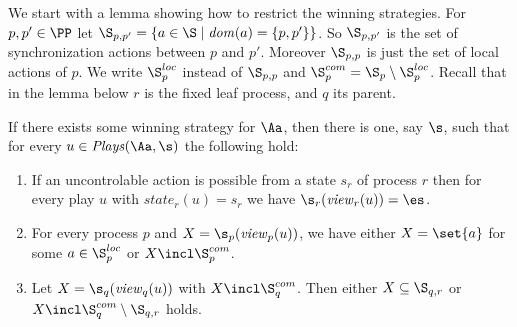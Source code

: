 \documentclass{llncs}
\newcommand{\state}{\mathit{state}}
\newcommand{\loc}{\mathit{dom}}
\newcommand{\Plays}{\mathit{Plays}}
\newcommand{\view}{\mathit{view}}
\begin{document}
We start with a lemma showing how to
restrict the winning strategies. 
For $p,p' \in \PP$ let $\S_{p,p'} =\{a
\in\S \mid \loc(a)=\{p,p'\}\}$. So $\S_{p,p'}$ is the set of
synchronization actions between $p$ and $p'$. Moreover $\S_{p,p}$ is
just the set of local actions of $p$. We write $\S^{loc}_p$ instead of
$\S_{p,p}$ and $\S^{com}_p = \S_p \setminus \S^{loc}_p$. Recall that in
the lemma below $r$ is the fixed leaf process, and $q$ its
parent. 


 \begin{lemma}\label{l:separation}
  If there exists some winning strategy for $\Aa$, then there is one, say
  $\s$,  such that for every  $u \in \Plays(\Aa,\s)$ the
  following hold:
  \begin{enumerate}
  \item If an uncontrolable action is possible from a state $s_r$ of
    process $r$ then for every play $u$ with $\state_r(u)=s_r$ we have
    $\s_r(\view_r(u))=\es$.
  \item For every process $p$ and $X=\s_p(\view_p(u))$, we have either
    $X=\set{a}$ for some $a\in\S^{loc}_p$ or $X\incl\S_p^{com}$.
  \item Let $X=\s_q(\view_q(u))$ with $X\incl\S_q^{com}$. Then either
    $X \subseteq \S_{q,r}$ or $X\incl\S_q^{com} \setminus \S_{q,r}$
    holds.
  \end{enumerate}
\end{lemma}
\end{document}
